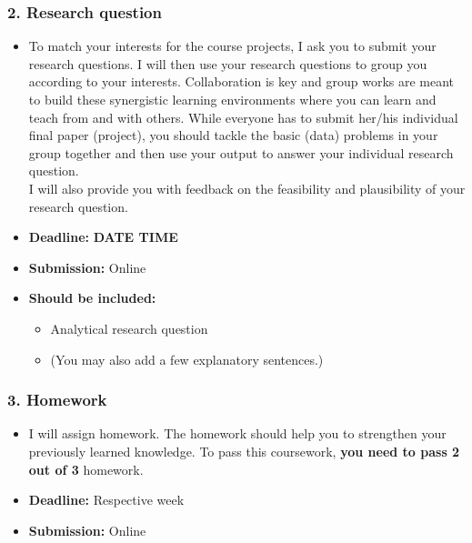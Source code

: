 \documentclass{article}
\begin{document}
\subsubsection*{2. Research question}
\begin{itemize}
\item[] To match your interests for the course projects, I ask you to submit your research questions. I will then use your research questions to group you according to your interests. Collaboration is key and group works are meant to build these synergistic learning environments where you can learn and teach from and with others. While everyone has to submit her/his individual final paper (project), you should tackle the basic (data) problems in your group together and then use your output to answer your individual research question.\\
I will also provide you with feedback on the feasibility and plausibility of your research question.
 \item[] \textbf{Deadline:} \textbf{\textbf{DATE} \textbf{TIME}}
 \item[] \textbf{Submission:} Online
  \item[] \textbf{Should be included:}
  \begin{itemize}
      \item[-] Analytical research question 
      \item[-] (You may also add a few explanatory sentences.) 
  \end{itemize}
      \end{itemize}
      
\subsubsection*{3. Homework}
\begin{itemize}
\item[] I will assign homework. The homework should help you to strengthen your previously learned knowledge. To pass this coursework, \textbf{you need to pass 2 out of 3} homework.
\item[] \textbf{Deadline:} Respective week
\item[] \textbf{Submission:} Online
\end{itemize}      
\end{document}
